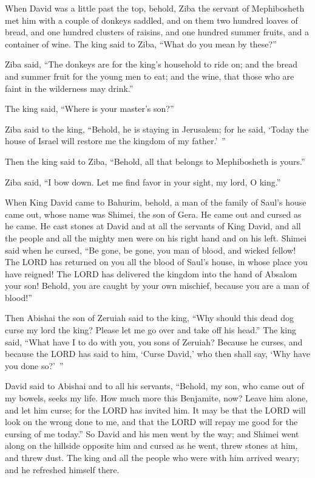 \mychapter{} \myverse*{}When David was a little past the top, behold, Ziba the servant
of Mephibosheth met him with a couple of donkeys saddled, and on them two hundred loaves of bread, and
one hundred clusters of raisins, and one hundred summer fruits, and a container of wine.
\myverse{}The king said to Ziba, “What do you mean by these?”

Ziba said, “The donkeys are for the king’s household to ride on; and the bread and summer
fruit for the young men to eat; and the wine, that those who are faint in the wilderness may drink.”

\myverse{}The king said, “Where is your master’s son?”

Ziba said to the king, “Behold, he is staying in Jerusalem; for he said, ‘Today the house
of Israel will restore me the kingdom of my father.’ ”

\myverse{}Then the king said to Ziba, “Behold, all that belongs to Mephibosheth
is yours.”

Ziba said, “I bow down. Let me find favor in your sight, my lord, O king.”

\myverse{}When King David came to Bahurim, behold, a man of the family of
Saul’s house came out, whose name was Shimei, the son of Gera. He came out and cursed as he came.
\myverse{}He cast stones at David and at all the servants of King David, and all the
people and all the mighty men were on his right hand and on his left.
\myverse{}Shimei said when he cursed, “Be gone, be gone, you man of blood, and wicked
fellow!
\myverse{}The LORD has returned on you all the blood of Saul’s house, in whose place
you have reigned! The LORD has delivered the kingdom into the hand of Absalom your son! Behold, you are
caught by your own mischief, because you are a man of blood!”

\myverse{}Then Abishai the son of Zeruiah said to the king, “Why should
this dead dog curse my lord the king? Please let me go over and take off his head.”
\myverse{}The king said, “What have I to do with you, you sons of Zeruiah? Because
he curses, and because the LORD has said to him, ‘Curse David,’ who then shall say, ‘Why have you done
so?’ ”

\myverse{}David said to Abishai and to all his servants, “Behold, my son,
who came out of my bowels, seeks my life. How much more this Benjamite, now? Leave him alone, and let
him curse; for the LORD has invited him.
\myverse{}It may be that the LORD will look on the wrong done to me, and that the LORD
will repay me good for the cursing of me today.”
\myverse{}So David and his men went by the way; and Shimei went along on the hillside
opposite him and cursed as he went, threw stones at him, and threw dust.
\myverse{}The king and all the people who were with him arrived weary; and he refreshed
himself there.

